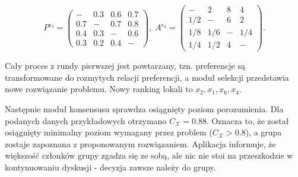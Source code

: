 $$
P^{e_3} = 
\begin{pmatrix}
-  & 0.3   & 0.6   & 0.7  \\
0.7  & -   & 0.7     & 0.8  \\
0.4  & 0.3     & -   & 0.6  \\
0.3  & 0.2   & 0.4   & -
\end{pmatrix},\;
A^{e_4} = 
\begin{pmatrix}
-  & 2  & 8  & 4 \\
1/2 & -   & 6  & 2 \\
1/8 & 1/6  & -   & 1/4 \\
1/4 & 1/2  & 4  & -
\end{pmatrix}.
$$

Cały proces z rundy pierwszej jest powtarzany, tzn. preferencje są
transformowane do rozmytych relacji preferencji, a moduł selekcji przedstawia
nowe rozwiązanie problemu. Nowy ranking lokali to $x_2, x_1, x_6, x_4$.

Następnie moduł konsensusu sprawdza osiągnięty poziom porozumienia. Dla podanych
danych przykładowych otrzymano $C_{\mathcal{X}} = 0.88$. Oznacza to, że został
osiągnięty minimalny poziom wymagany przez problem ($C_{\mathcal{X}} > 0.8$),
a grupa zostaje zapoznana z proponowanym rozwiązaniem. Aplikacja informuje, że
większość członków grupy zgadza się ze sobą, ale nic nie stoi na przeszkodzie w
kontynuowaniu dyskusji - decyzja zawsze należy do grupy.

